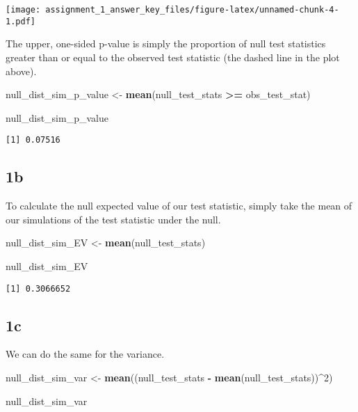 \documentclass[
  12pt,
  leqno]{article}
\newenvironment{Shaded}{\begin{snugshade}}{\end{snugshade}}
\newcommand{\DecValTok}[1]{\textcolor[rgb]{0.00,0.00,0.81}{#1}}
\newcommand{\KeywordTok}[1]{\textcolor[rgb]{0.13,0.29,0.53}{\textbf{#1}}}
\newcommand{\NormalTok}[1]{#1}
\newcommand{\OperatorTok}[1]{\textcolor[rgb]{0.81,0.36,0.00}{\textbf{#1}}}
\newcommand{\StringTok}[1]{\textcolor[rgb]{0.31,0.60,0.02}{#1}}
\DeclareMathOperator{\1}{\mathbbm{1}}
\begin{document}
\texttt{[image: assignment\_1\_answer\_key\_files/figure-latex/unnamed-chunk-4-1.pdf]}
\normalsize

The upper, one-sided p-value is simply the proportion of null test
statistics greater than or equal to the observed test statistic (the
dashed line in the plot above). \scriptsize

\begin{Shaded}
\begin{Highlighting}[]
\NormalTok{null\_dist\_sim\_p\_value \textless{}{-}}\StringTok{ }\KeywordTok{mean}\NormalTok{(null\_test\_stats }\OperatorTok{\textgreater{}=}\StringTok{ }\NormalTok{obs\_test\_stat)}

\NormalTok{null\_dist\_sim\_p\_value}
\end{Highlighting}
\end{Shaded}

\begin{verbatim}
[1] 0.07516
\end{verbatim}

\normalsize
\subsection*{1b}

To calculate the null expected value of our test statistic, simply take
the mean of our simulations of the test statistic under the null.
\scriptsize

\begin{Shaded}
\begin{Highlighting}[]
\NormalTok{null\_dist\_sim\_EV \textless{}{-}}\StringTok{ }\KeywordTok{mean}\NormalTok{(null\_test\_stats)}

\NormalTok{null\_dist\_sim\_EV}
\end{Highlighting}
\end{Shaded}

\begin{verbatim}
[1] 0.3066652
\end{verbatim}

\normalsize
\subsection*{1c}

We can do the same for the variance. \scriptsize

\begin{Shaded}
\begin{Highlighting}[]
\NormalTok{null\_dist\_sim\_var \textless{}{-}}\StringTok{ }\KeywordTok{mean}\NormalTok{((null\_test\_stats }\OperatorTok{{-}}\StringTok{ }\KeywordTok{mean}\NormalTok{(null\_test\_stats))}\OperatorTok{\^{}}\DecValTok{2}\NormalTok{)}

\NormalTok{null\_dist\_sim\_var}
\end{Highlighting}
\end{Shaded}
\end{document}
